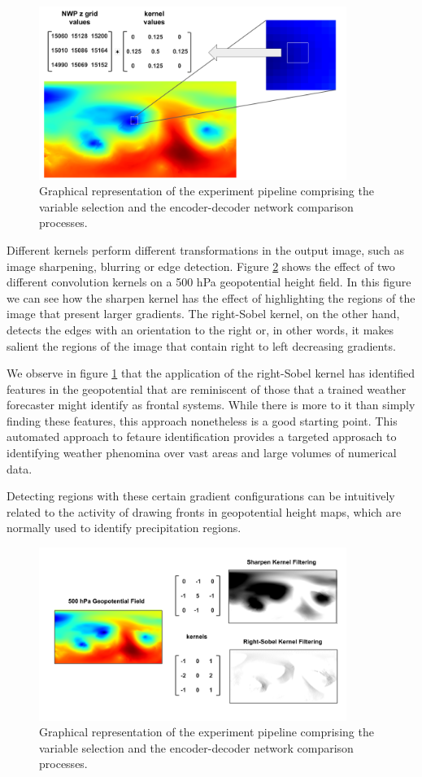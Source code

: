 \documentclass[twocol]{ametsoc}
\begin{document}
\begin{figure}[h]
 \centerline{\includegraphics[width=10cm]{convolution_op.png}}
  \caption{Graphical representation of the experiment pipeline comprising the variable selection and the encoder-decoder network comparison processes.}\label{convolution_op}
\end{figure}

Different kernels perform different transformations in the output image, such as image sharpening, blurring or edge detection. Figure \ref{kernels} shows the effect of two different convolution kernels on a 500 hPa geopotential height field. In this figure we can see how the sharpen kernel has the effect of highlighting the regions of the image that present larger gradients. The right-Sobel kernel, on the other hand, detects the edges with an orientation to the right or, in other words, it makes salient the regions of the image that contain right to left decreasing gradients. 

We observe in figure \ref{convolution_op} that the application of the right-Sobel kernel has identified features in the geopotential that are reminiscent of those that a trained weather forecaster might identify as frontal systems. While there is more to it than simply finding these features, this approach nonetheless is a good starting point. This automated approach to fetaure identification provides a targeted approsach to identifying weather phenomina over vast areas and large volumes of numerical data.

Detecting regions with these certain gradient configurations can be intuitively related to the activity of drawing fronts in geopotential height maps, which are normally used to identify precipitation regions. 

\begin{figure}[h]
 \centerline{\includegraphics[width=10cm]{kernels.png}}
  \caption{Graphical representation of the experiment pipeline comprising the variable selection and the encoder-decoder network comparison processes.}\label{kernels}
\end{figure}
\end{document}
